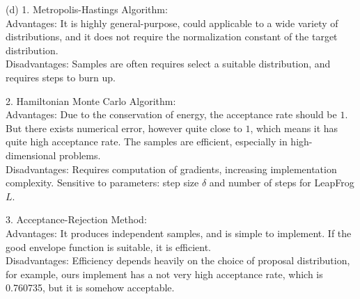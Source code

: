\begin{homeworkProblem}
(d) 1. Metropolis-Hastings Algorithm: \\
Advantages: It is highly general-purpose, could applicable to a wide variety of distributions, and it does not require the normalization constant of the target distribution. \\
Disadvantages: Samples are often requires select a suitable distribution, and requires steps to burn up.

2. Hamiltonian Monte Carlo Algorithm: \\
Advantages: Due to the conservation of energy, the acceptance rate should be $1$. But there exists numerical error, however quite close to $1$, which means it has quite high acceptance rate. The samples are efficient, especially in high-dimensional problems. \\
Disadvantages: Requires computation of gradients, increasing implementation complexity. Sensitive to parameters: step size $\delta$ and number of steps for LeapFrog $L$.

3. Acceptance-Rejection Method: \\
Advantages: It produces independent samples, and is simple to implement. If the good envelope function is suitable, it is efficient. \\
Disadvantages: Efficiency depends heavily on the choice of proposal distribution, for example, ours implement has a not very high acceptance rate, which is 0.760735, but it is somehow acceptable.

\end{homeworkProblem}

\newpage